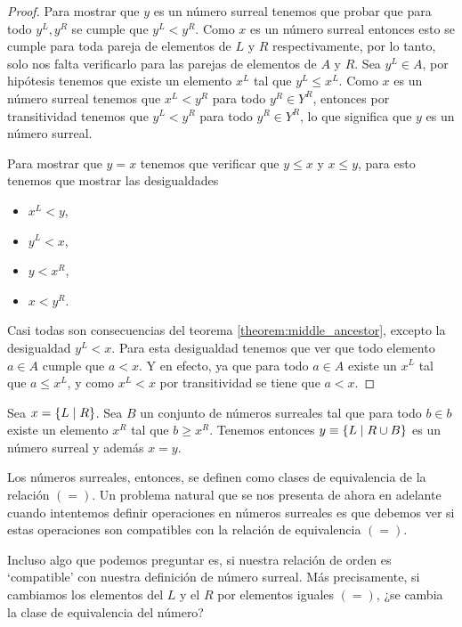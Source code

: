     \begin{proof}
        Para mostrar que $y$ es un n\'umero surreal tenemos que probar que para todo $y^L, y^R$ se cumple que $y^L < y^R$. Como $x$ es un n\'umero surreal entonces esto se cumple para toda pareja de elementos de $L$ y $R$ respectivamente, por lo tanto, solo nos falta verificarlo para las parejas de elementos de $A$ y $R$. Sea $y^L\in A$, por hip\'otesis tenemos que existe un elemento $x^L$ tal que $y^L \le x^L$. Como $x$ es un n\'umero surreal tenemos que $x^L < y^R$ para todo $y^R\in Y^R$, entonces por transitividad tenemos que $y^L < y^R$ para todo $y^R\in Y^R$, lo que significa que $y$ es un n\'umero surreal.

        Para mostrar que $y=x$ tenemos que verificar que $y\le x$ y $x \le y$, para esto tenemos que mostrar las desigualdades
        \begin{itemize}[nosep]
            \item $x^L < y$,
            \item $y^L < x$,
            \item $y < x^R$,
            \item $x < y^R$.
        \end{itemize}
        Casi todas son consecuencias del teorema \ref{theorem:middle_ancestor}, excepto la desigualdad $y^L < x$. Para esta desigualdad tenemos que ver que todo elemento $a\in A$ cumple que $a < x$. Y en efecto, ya que para todo $a\in A$ existe un $x^L$ tal que $a \le x^L$, y como $x^L < x$ por transitividad se tiene que $a < x$.
    \end{proof}

    \begin{corollary}
        \label{corollary:add_right}
        Sea $x = \left\{L\;\middle|\; R\right\}$. Sea $B$ un conjunto de n\'umeros surreales tal que para todo $b\in b$ existe un elemento $x^R$ tal que $b \ge x^R$. Tenemos entonces $y\equiv \left\{L\;\middle|\; R\cup B\right\}$ es un n\'umero surreal y adem\'as $x = y$.
    \end{corollary}

    Los n\'umeros surreales, entonces, se definen como clases de equivalencia de la relaci\'on $(=)$. Un problema natural que se nos presenta de ahora en adelante cuando intentemos definir operaciones en n\'umeros surreales es que debemos ver si estas operaciones son compatibles con la relaci\'on de equivalencia $(=)$.    

    Incluso algo que podemos preguntar es, si nuestra relaci\'on de orden es `compatible' con nuestra definici\'on de n\'umero surreal. M\'as precisamente, si cambiamos los elementos del $L$ y el $R$ por elementos iguales $(=)$, ¿se cambia la clase de equivalencia del n\'umero?

